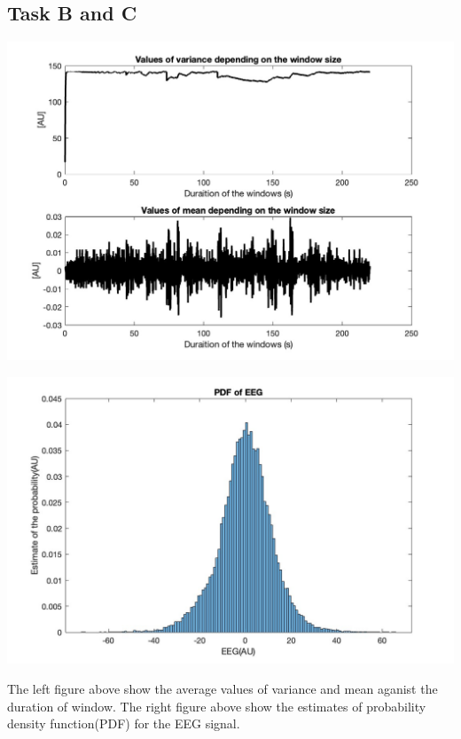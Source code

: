 \documentclass[8pt]{article}  %
\theoremstyle{plain}
\theoremstyle{definition}
\theoremstyle{remark}
\begin{document}
    \subsection{Task B and C}
    \begin{minipage}{0.5\textwidth}  
    \centering
    \includegraphics[width=\linewidth]{figure/figure3.jpg}  
    \end{minipage}
    \hfill  
    \begin{minipage}{0.48\textwidth}  
    \centering  
    \includegraphics[width=\linewidth]{figure/figure4.jpg}  
    \end{minipage}
    The left figure above show the average values of variance and mean aganist the duration of window.
    The right figure above show the estimates of probability density function(PDF) for the EEG signal.
   
\end{document}

